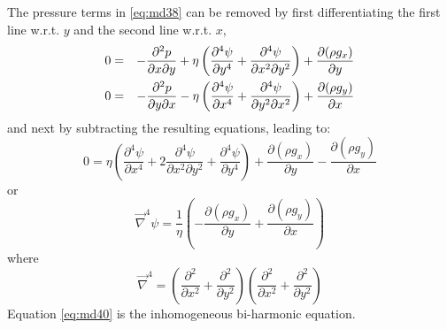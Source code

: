 The pressure terms in \eqref{eq:md38} can be removed by first differentiating
the first line w.r.t. $y$ and the second line w.r.t. $x$,
\begin{eqnarray}
0 &=& -\frac{\partial^2 p}{\partial x\partial y} + \eta \left(
\frac{\partial^4 \psi}{\partial y^4}  + \frac{\partial^4 \psi}{\partial x^2 \partial y^2}
\right) + \frac{\partial (\rho g_x)}{\partial y} \nonumber\\
0 &=& -\frac{\partial^2 p}{\partial y \partial x} - \eta \left(
\frac{\partial^4 \psi}{\partial x^4}  + \frac{\partial^4 \psi}{\partial y^2 \partial x^2}
\right) + \frac{\partial (\rho g_y)}{\partial x}
\label{eq:md38b}
\end{eqnarray}
and next by subtracting the resulting equations, leading to:
\begin{equation}
0 = \eta
\left(
\frac{\partial^4 \psi}{\partial x^4}
+
2\frac{\partial^4 \psi}{\partial x^2\partial y^2}
+
\frac{\partial^4 \psi}{\partial y^4}
\right)
+\frac{\partial (\rho g_x)}{\partial y}
-\frac{\partial (\rho g_y)}{\partial x}
\label{eq:md39}
\end{equation}
or
\begin{equation}
\vec\nabla^4 \psi = \frac{1}{\eta} \left( -\frac{\partial (\rho g_x)}{\partial y}
+\frac{\partial (\rho g_y)}{\partial x} \right)
\label{eq:md40}
\end{equation}
where
\[
\vec\nabla^4 = 
\left( 
\frac{\partial^2 }{\partial x^2} + \frac{\partial^2 }{\partial y^2} 
\right) 
\left( 
\frac{\partial^2 }{\partial x^2} + \frac{\partial^2 }{\partial y^2} 
\right) 
\]
Equation \eqref{eq:md40} is the inhomogeneous bi-harmonic equation.



\vspace{0.5cm}
\vspace{0.5cm}

